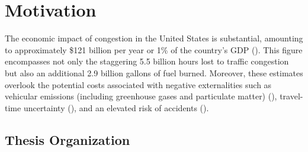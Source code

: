 \chapter{Motivation}
The economic impact of congestion in the United States is substantial, amounting to approximately \$121 billion per year or 1\% of the country's GDP (\cite{schrank2012}). This figure encompasses not only the staggering 5.5 billion hours lost to traffic congestion but also an additional 2.9 billion gallons of fuel burned. Moreover, these estimates overlook the potential costs associated with negative externalities such as vehicular emissions (including greenhouse gases and particulate matter) (\cite{pant2013}), travel-time uncertainty (\cite{carrion2012}), and an elevated risk of accidents (\cite{hennessy1999}).

\section{Thesis Organization}